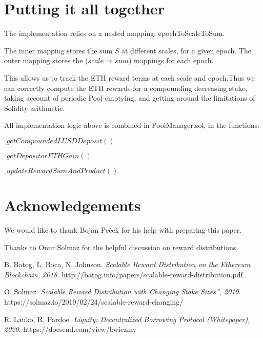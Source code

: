 \documentclass[reqno]{article}
\begin{document}
\bigskip
\section{Putting it all together}

\bigskip
The implementation relies on a nested mapping: epochToScaleToSum. 

\bigskip
The inner mapping stores the sum $S$ at different scales, for a given epoch. The outer mapping stores the ($scale \Rightarrow sum$) mappings for each epoch.

\bigskip
This allows us to track the ETH reward terms at each scale and epoch.Thus we can correctly compute the ETH rewards for a compounding decreasing stake, taking account of periodic Pool-emptying, and getting around the limitations of Solidity arithmetic.

\bigskip
All implementation logic above is combined in PoolManager.sol, in the functions:

\bigskip
$\_getCompoundedLUSDDeposit()$

$\_getDepositorETHGain()$

$\_updateRewardSumAndProduct()$

\section{Acknowledgements}
We would like to thank Bojan Peček for his help with preparing this paper.

Thanks to Onur Solmaz for the helpful discussion on reward distributions.

\begin{thebibliography}{9}
B. Batog, L. Boca, N. Johnson.
\textit{Scalable Reward Distribution on the Ethereum Blockchain, 2018}. 
http://batog.info/papers/scalable-reward-distribution.pdf

O. Solmaz. 
\textit{Scalable Reward Distribution with Changing Stake Sizes”, 2019}. 
https://solmaz.io/2019/02/24/scalable-reward-changing/

R. Lauko, R. Pardoe. 
\textit{Liquity: Decentralized Borrowing Protocol (Whitepaper), 2020}. 
https://docsend.com/view/bwiczmy


\end{thebibliography}
\end{document}
